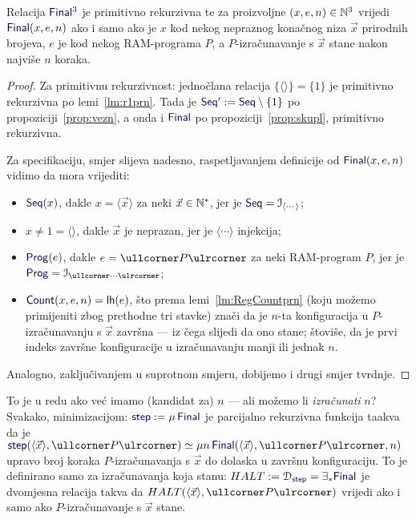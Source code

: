 \begin{lema}[{name=[primitivna rekurzivnost završnosti konfiguracije]}]\label{lm:Finalspec}
Relacija $\f{Final}^3$ je primitivno rekurzivna te
za proizvoljne $(x,e,n)\in{\mathbb N}^3$ vrijedi $\f{Final}(x,e,n)$ ako i samo ako je $x$ kod nekog nepraznog konačnog niza $\vec x$ prirodnih brojeva, $e$ je kod nekog RAM-programa $P$, a $P$-izračunavanje s $\vec x$ stane nakon najviše $n$ koraka.
\end{lema}
\begin{proof}
    Za primitivnu rekurzivnost: jednočlana relacija $\{\langle\rangle\}=\{1\}$ je primitivno rekurzivna po lemi~\ref{lm:r1prn}. Tada je $\f{Seq'}:=\f{Seq}\setminus\{1\}$ po propoziciji~\ref{prop:vezn}, a onda i $\f{Final}$ po propoziciji~\ref{prop:skupl}, primitivno rekurzivna.

Za specifikaciju, smjer slijeva nadesno, raspetljavanjem definicije od $\f{Final}(x,e,n)$ vidimo da mora vrijediti:
\begin{itemize}
    \item $\f{Seq}(x)$, dakle $x=\langle\vec x\rangle$ za neki $\vec x\in{\mathbb N}^*$, jer je $\f{Seq}=\im{\langle\cdots\rangle}$;
    \item $x\ne1=\langle\rangle$, dakle $\vec x$ je neprazan, jer je $\langle\cdots\rangle$ injekcija;
    \item $\f{Prog}(e)$, dakle $e=\kprog{P}$ za neki RAM-program $P$, jer je $\f{Prog}=\im{\kprog{\cdots}}$;
    \item $\f{Count}(x,e,n)\eq\f{lh}(e)$, što prema lemi~\ref{lm:RegCountprn} (koju možemo primijeniti zbog prethodne tri stavke) znači da je $n$-ta konfiguracija u $P$-izračunavanju s $\vec x$ završna --- iz čega slijedi da ono stane; štoviše, da je prvi indeks završne konfiguracije u izračunavanju manji ili jednak $n$.
\end{itemize}
Analogno, zaključivanjem u suprotnom smjeru, dobijemo i drugi smjer tvrdnje.
\end{proof}

To je u redu ako već imamo (kandidat za) $n$ --- ali možemo li \emph{izračunati} $n$? Svakako, minimizacijom: $\f{step}:=\mu\,\f{Final}$ je parcijalno rekurzivna funkcija taakva da je $\f{step}(\langle\vec x\rangle,\kprog P)\simeq\mu n\,\f{Final}(\langle\vec x\rangle,\kprog{P},n)$ upravo broj koraka $P$-izračunavanja s $\vec x$ do dolaska u završnu konfiguraciju. To je definirano samo za izračunavanja koja stanu: $HALT:=\dom{\f{step}}=\exists_*\f{Final}$ je dvomjesna relacija takva da $HALT(\langle \vec x\rangle,\kprog P)$ vrijedi ako i samo ako $P$-izračunavanje s $\vec x$ stane.

